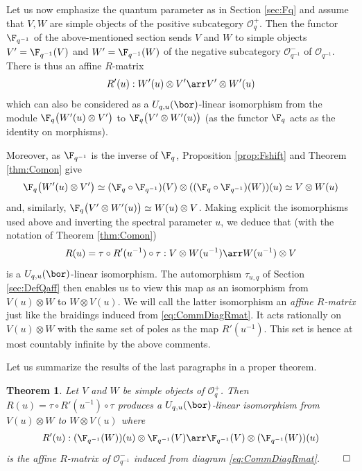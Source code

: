 \documentclass[11pt]{amsart}
\newtheorem{theorem}{Theorem}[section]
\theoremstyle{definition}
\theoremstyle{remark}
\numberwithin{equation}{section}
\begin{document}
Let us now emphasize the quantum parameter as in Section \ref{sec:Fq} and assume that $V,W$ are simple objects of the positive subcategory $\mathcal{O}^+_q$. Then the functor $\F_{q^{-1}}$ of the above-mentioned section sends $V$ and $W$ to simple objects $V'=\F_{q^{-1}}(V)$ and $W' = \F_{q^{-1}}(W)$ of the negative subcategory $\mathcal{O}^-_{q^{-1}}$ of $\mathcal{O}_{q^{-1}}$. There is thus an affine $R$-matrix 
$$ R'(u) : W'(u)\otimes V' \arr V'\otimes W'(u)$$ 
which can also be considered as a $U_{q,u}(\bor)$-linear isomorphism from the module $\F_q\big(W'(u)\otimes V'\big)$ to $\F_q\big(V'\otimes W'(u)\big)$ (as the functor $\F_q$ acts as the identity on morphisms). \par Moreover, as $\F_{q^{-1}}$ is the inverse of $\F_q$, Proposition \ref{prop:Fshift} and Theorem \ref{thm:Comon} give
$$  \F_q\big(W'(u)\otimes V'\big) \simeq (\F_q\circ\F_{q^{-1}})(V)\otimes ((\F_q\circ\F_{q^{-1}})(W))(u) \simeq V\otimes W(u)$$
and, similarly, $\F_q\big(V'\otimes W'(u)\big) \simeq W(u)\otimes V$. Making explicit the isomorphisms used above and inverting the spectral parameter $u$, we deduce that (with the notation of Theorem \ref{thm:Comon})
\begin{equation}\label{eq:RmatOp}
 R(u) = \tau \circ R'(u^{-1}) \circ \tau : V\otimes W(u^{-1}) \arr W(u^{-1})\otimes V
\end{equation}
is a $U_{q,u}(\bor)$-linear isomorphism. The automorphism $\tau_{u,q}$ of Section \ref{sec:DefQaff} then enables us to view this map as an isomorphism from $V(u)\otimes W $ to $W\otimes V(u)$. We will call the latter isomorphism an \textit{affine $R$-matrix} just like the braidings induced from \eqref{eq:CommDiagRmat}. It acts rationally on $V(u)\otimes W$ with the same set of poles as the map $R'(u^{-1})$. This set is hence at most countably infinite by the above comments.\par 
Let us summarize the results of the last paragraphs in a proper theorem. 
\begin{theorem}\label{thm:RmatOp} Let $V$ and $W$ be simple objects of $\mathcal{O}^+_q$. Then $R(u) = \tau \circ R'(u^{-1}) \circ \tau$ produces a $U_{q,u}(\bor)$-linear isomorphism from $V(u)\otimes W$ to $W\otimes V(u)$ where $$R'(u): (\F_{q^{-1}}(W))(u)\otimes \F_{q^{-1}}(V)\arr \F_{q^{-1}}(V)\otimes (\F_{q^{-1}}(W))(u)$$ is the affine $R$-matrix of $\mathcal{O}_{q^{-1}}^-$ induced from diagram \eqref{eq:CommDiagRmat}. \hfill $\qed$
\end{theorem}
\end{document}
